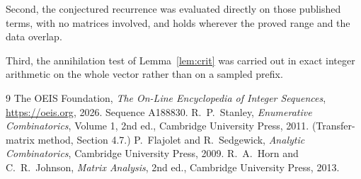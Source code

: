\documentclass[11pt,a4paper]{article}
\theoremstyle{plain}
\theoremstyle{definition}
\begin{document}
Second, the conjectured recurrence was evaluated directly on those published terms, with no
matrices involved, and holds wherever the proved range and the data overlap.

Third, the annihilation test of Lemma~\ref{lem:crit} was carried out in exact integer
arithmetic on the whole vector rather than on a sampled prefix.

\begin{thebibliography}{9}
 The OEIS Foundation, \emph{The On-Line Encyclopedia of Integer
Sequences}, \url{https://oeis.org}, 2026. Sequence A188830.
 R.~P.~Stanley, \emph{Enumerative Combinatorics}, Volume 1, 2nd ed.,
Cambridge University Press, 2011. (Transfer-matrix method, Section 4.7.)
 P.~Flajolet and R.~Sedgewick, \emph{Analytic Combinatorics}, Cambridge
University Press, 2009.
 R.~A.~Horn and C.~R.~Johnson, \emph{Matrix Analysis}, 2nd ed., Cambridge
University Press, 2013.
\end{thebibliography}
\end{document}

